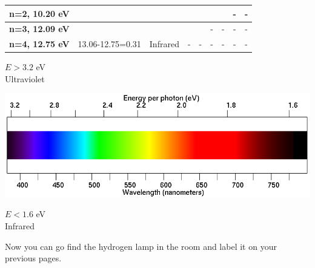 \documentclass[11pt]{article}
\begin{document}
\begin{landscape}
\begin{tabular}{|c|c|c|c|c|c|c|c|c|}
		\textbf{n=2, 10.20 eV}              &                             &                                   &                                          &                                          &                                          &                                          & -                        & -                        \\ \hline
		\textbf{n=3, 12.09 eV}              &                              &                                 &                                          &                                          & -                        & -                        & -                        & -                        \\ \hline
		\textbf{n=4, 12.75 eV}              & 13.06-12.75=0.31                             & Infrared                                & -                        & -                        & -                        & -                        & -                        & -                        \\ \hline
	\end{tabular}
	
	\bigskip
	
	\begin{minipage}{1in}
		\large
		$E > 3.2$ eV\\
		Ultraviolet
	\end{minipage}
	\begin{minipage}{8in}
		\includegraphics[width=\textwidth]{spectrum2.png}
	\end{minipage}
	\begin{minipage}{1in}
		$E < 1.6$ eV\\
		Infrared
	\end{minipage}
	
	
	\vspace{1in}
	
	Now you can go find the hydrogen lamp in the room and label it on your previous pages.
	
\end{landscape}
\end{document}
